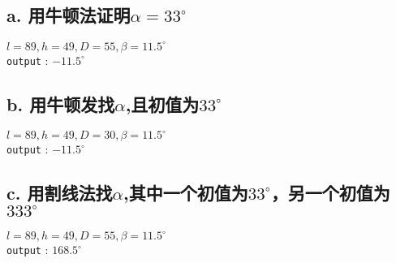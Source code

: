 \documentclass{ctexart}
\begin{document}
\subsection*{a. 用牛顿法证明$\alpha = 33^{\circ}$ }
\begin{flushleft}
  \quad $l=89 , h=49 , D=55 , \beta=11.5^{\circ}$ \\
  \quad \verb|output| : $-11.5^{\circ}$ \\
\end{flushleft}

\subsection*{b. 用牛顿发找$\alpha$,且初值为$33^{\circ}$}
\begin{flushleft}
  \quad $l=89 , h=49 , D=30 , \beta=11.5^{\circ}$ \\
  \quad \verb|output| : $-11.5^{\circ}$ \\
\end{flushleft}

\subsection*{c. 用割线法找$\alpha$,其中一个初值为$33^{\circ}$，另一个初值为$333^{\circ}$}
\begin{flushleft}
  \quad $l=89 , h=49 , D=55 , \beta=11.5^{\circ}$ \\
  \quad \verb|output| : $168.5^{\circ}$ \\
\end{flushleft}
  
\end{document}
